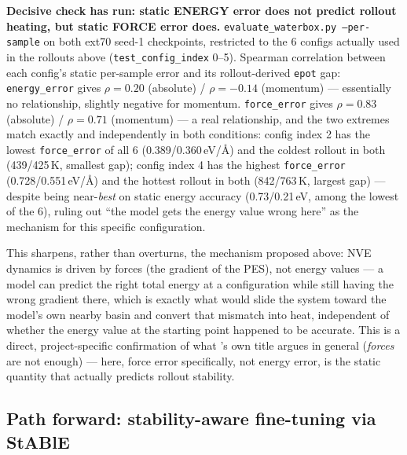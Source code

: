 \documentclass[11pt]{article}
\begin{document}
\textbf{Decisive check has run: static ENERGY error does not predict rollout
heating, but static FORCE error does.} \texttt{evaluate\_waterbox.py
--per-sample} on both ext70 seed-1 checkpoints, restricted to the 6 configs
actually used in the rollouts above (\texttt{test\_config\_index} 0--5).
Spearman correlation between each config's static per-sample error and its
rollout-derived \texttt{epot} gap: \texttt{energy\_error} gives
$\rho=0.20$ (absolute) / $\rho=-0.14$ (momentum) --- essentially no
relationship, slightly negative for momentum. \texttt{force\_error} gives
$\rho=0.83$ (absolute) / $\rho=0.71$ (momentum) --- a real relationship,
and the two extremes match exactly and independently in both conditions:
config index 2 has the lowest \texttt{force\_error} of all 6
(0.389/0.360\,eV/\AA) and the coldest rollout in both (439/425\,K, smallest
gap); config index 4 has the highest \texttt{force\_error}
(0.728/0.551\,eV/\AA) and the hottest rollout in both (842/763\,K, largest
gap) --- despite being near-\emph{best} on static energy accuracy
(0.73/0.21\,eV, among the lowest of the 6), ruling out ``the model gets the
energy value wrong here'' as the mechanism for this specific configuration.

This sharpens, rather than overturns, the mechanism proposed above: NVE
dynamics is driven by forces (the gradient of the PES), not energy values
--- a model can predict the right total energy at a configuration while
still having the wrong gradient there, which is exactly what would slide
the system toward the model's own nearby basin and convert that mismatch
into heat, independent of whether the energy value at the starting point
happened to be accurate. This is a direct, project-specific confirmation of
what \citet{fu2022forces}'s own title argues in general (\emph{forces} are
not enough) --- here, force error specifically, not energy error, is the
static quantity that actually predicts rollout stability.

\subsection{Path forward: stability-aware fine-tuning via StABlE}
\label{sec:q4-stable-path}
\end{document}
